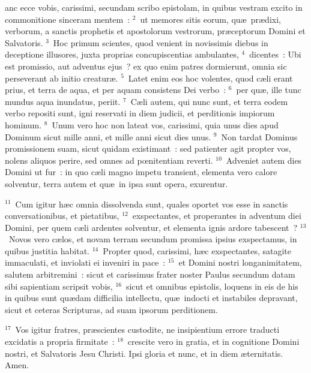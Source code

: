 \bchapter
{}anc ecce vobis, carissimi, secundam scribo epistolam, in quibus vestram excito in commonitione sinceram mentem~:
${}^{2}$~ut memores sitis eorum, qu\ae\ pr\ae dixi, verborum, a sanctis prophetis et apostolorum vestrorum, pr\ae ceptorum Domini et Salvatoris.
${}^{3}$~Hoc primum scientes, quod venient in novissimis diebus in deceptione illusores, juxta proprias concupiscentias ambulantes,
${}^{4}$~dicentes~: Ubi est promissio, aut adventus ejus~? ex quo enim patres dormierunt, omnia sic perseverant ab initio creatur\ae .
${}^{5}$~Latet enim eos hoc volentes, quod c\ae li erant prius, et terra de aqua, et per aquam consistens Dei verbo~:
${}^{6}$~per qu\ae , ille tunc mundus aqua inundatus, periit.
${}^{7}$~C\ae li autem, qui nunc sunt, et terra eodem verbo repositi sunt, igni reservati in diem judicii, et perditionis impiorum hominum.
${}^{8}$~Unum vero hoc non lateat vos, carissimi, quia unus dies apud Dominum sicut mille anni, et mille anni sicut dies unus.
${}^{9}$~Non tardat Dominus promissionem suam, sicut quidam existimant~: sed patienter agit propter vos, nolens aliquos perire, sed omnes ad pœnitentiam reverti.
${}^{10}$~Adveniet autem dies Domini ut fur~: in quo c\ae li magno impetu transient, elementa vero calore solventur, terra autem et qu\ae\ in ipsa sunt opera, exurentur.


${}^{11}$~Cum igitur h\ae c omnia dissolvenda sunt, quales oportet vos esse in sanctis conversationibus, et pietatibus,
${}^{12}$~exspectantes, et properantes in adventum diei Domini, per quem c\ae li ardentes solventur, et elementa ignis ardore tabescent~?
${}^{13}$~Novos vero c\ae los, et novam terram secundum promissa ipsius exspectamus, in quibus justitia habitat.
${}^{14}$~Propter quod, carissimi, h\ae c exspectantes, satagite immaculati, et inviolati ei inveniri in pace~:
${}^{15}$~et Domini nostri longanimitatem, salutem arbitremini~: sicut et carissimus frater noster Paulus secundum datam sibi sapientiam scripsit vobis,
${}^{16}$~sicut et omnibus epistolis, loquens in eis de his in quibus sunt qu\ae dam difficilia intellectu, qu\ae\ indocti et instabiles depravant, sicut et ceteras Scripturas, ad suam ipsorum perditionem.


${}^{17}$~Vos igitur fratres, pr\ae scientes custodite, ne insipientium errore traducti excidatis a propria firmitate~:
${}^{18}$~crescite vero in gratia, et in cognitione Domini nostri, et Salvatoris Jesu Christi. Ipsi gloria et nunc, et in diem \ae ternitatis. Amen.
